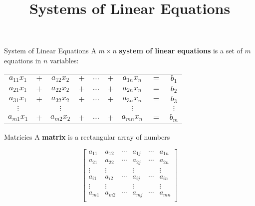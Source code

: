 \documentclass{beamer}
\title[MA178 - Section 8.2]{Systems of Linear Equations}
\begin{document}
\begin{frame}
  \titlepage
\end{frame}

\begin{frame}
\begin{block}{System of Linear Equations}
A $m\times n$ \textbf{system of linear equations} is a set of $m$ equations in $n$ variables:

\vspace{-3mm}
\begin{center}
\begin{tabular}{ccccccccc}
$a_{11}x_1$&$+$&$a_{12}x_2$&$+$&$\dots$&$+$&$a_{1n}x_n$&$=$&$b_1$\\
$a_{21}x_1$&$+$&$a_{22}x_2$&$+$&$\dots$&$+$&$a_{2n}x_n$&$=$&$b_2$\\
$a_{31}x_1$&$+$&$a_{32}x_2$&$+$&$\dots$&$+$&$a_{3n}x_n$&$=$&$b_3$\\
$\vdots$&&$\vdots$&&&&$\vdots$&&$\vdots$\\
$a_{m1}x_1$&$+$&$a_{m2}x_2$&$+$&$\dots$&$+$&$a_{mn}x_n$&$=$&$b_m$\\
\end{tabular}
\end{center}
\end{block}\pause
\begin{block}{Matricies}
A \textbf{matrix} is a rectangular array of numbers

\vspace{-2mm}
\begin{equation*}
\begin{bmatrix}
a_{11} & a_{12} & \cdots & a_{1j} & \cdots & a_{1n} \\
a_{21} & a_{22} & \cdots & a_{2j} & \cdots & a_{2n} \\
\vdots & \vdots &        & \vdots &        & \vdots \\
a_{i1} & a_{i2} & \cdots & a_{ij} & \cdots & a_{in} \\
\vdots & \vdots &        & \vdots &        & \vdots \\
a_{m1} & a_{m2} & \cdots & a_{mj} & \cdots & a_{mn} \\
\end{bmatrix}
\end{equation*}
\end{block}
\end{frame}
\end{document}
